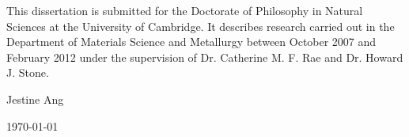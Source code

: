 \documentclass[11pt]{report}
\begin{document}


\textmd{This dissertation is submitted for the Doctorate of Philosophy in Natural Sciences at the University of Cambridge.  It describes research carried out in the Department of Materials Science and Metallurgy between October 2007 and February 2012 under the supervision of Dr.  Catherine M.  F.  Rae and Dr.  Howard J.  Stone.}

\vspace{1in}
\begin{flushright}
Jestine Ang

\today
\end{flushright}
\tableofcontents
%

%








%
%

\end{document}
